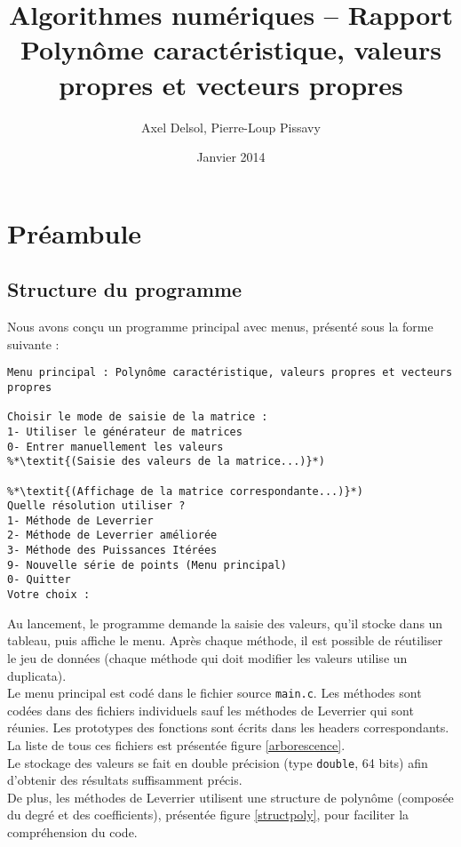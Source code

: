 \documentclass{report}
\title{Algorithmes numériques -- Rapport \\ \vspace{0.5cm}Polynôme caractéristique, valeurs propres et vecteurs propres}
\author{Axel Delsol, Pierre-Loup Pissavy}
\date{Janvier 2014}
\begin{document}
  \maketitle
  \tableofcontents
  
  \chapter{Préambule}
    \section{Structure du programme}
    Nous avons conçu un programme principal avec menus, présenté sous la forme suivante :
      \begin{lstlisting}[style=apercu, name=Menu Principal]
Menu principal : Polynôme caractéristique, valeurs propres et vecteurs propres

Choisir le mode de saisie de la matrice : 
1- Utiliser le générateur de matrices
0- Entrer manuellement les valeurs
%*\textit{(Saisie des valeurs de la matrice...)}*)

%*\textit{(Affichage de la matrice correspondante...)}*)
Quelle résolution utiliser ?
1- Méthode de Leverrier
2- Méthode de Leverrier améliorée
3- Méthode des Puissances Itérées
9- Nouvelle série de points (Menu principal)
0- Quitter
Votre choix :
      \end{lstlisting}
      
      Au lancement, le programme demande la saisie des valeurs, qu'il stocke dans un tableau, puis affiche le menu. Après chaque méthode, il est possible de réutiliser le jeu de données (chaque méthode qui doit modifier les valeurs utilise un duplicata). \\

Le menu principal est codé dans le fichier source \verb"main.c". Les méthodes sont codées dans des fichiers individuels sauf les méthodes de Leverrier qui sont réunies. Les prototypes des fonctions sont écrits dans les headers correspondants. 
La liste de tous ces fichiers est présentée figure \ref{arborescence}.\\

Le stockage des valeurs se fait en double précision (type \verb"double", 64 bits) afin d'obtenir des résultats suffisamment précis.\\

De plus, les méthodes de Leverrier utilisent une structure de polynôme (composée du degré et des coefficients), présentée figure \ref{structpoly}, pour faciliter la compréhension du code.
\end{document}
